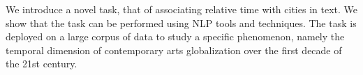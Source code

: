 We introduce a novel task, that of associating relative time with cities in text. We show that the task can be performed using NLP tools and techniques. The task is deployed on a large corpus of data to study a specific phenomenon, namely the temporal dimension of contemporary arts globalization over the first decade of the 21st century.
